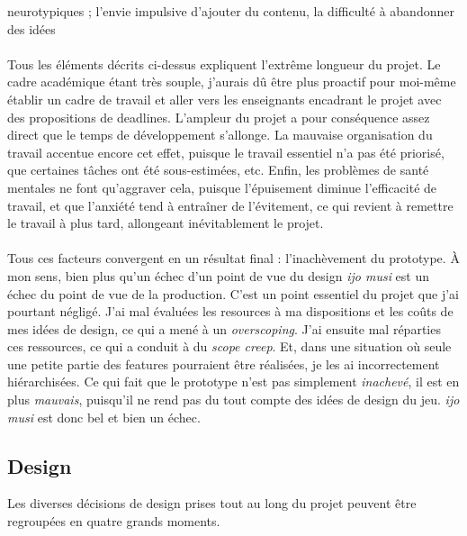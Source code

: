 \documentclass{scrartcl}
\let\emph\relax %
\begin{document}
neurotypiques ; l'envie impulsive d'ajouter du contenu, la difficulté à abandonner des idées\\
	
	\emph{Longueur du projet}\\
	Tous les éléments décrits ci-dessus expliquent l'extrême longueur du projet. Le cadre académique étant très souple, j'aurais dû être plus proactif pour moi-même établir un cadre de travail et aller vers les enseignants encadrant le projet avec des propositions de deadlines. L'ampleur du projet a pour conséquence assez direct que le temps de développement s'allonge. La mauvaise organisation du travail accentue encore cet effet, puisque le travail essentiel n'a pas été priorisé, que certaines tâches ont été sous-estimées, etc. Enfin, les problèmes de santé mentales ne font qu'aggraver cela, puisque l'épuisement diminue l'efficacité de travail, et que l'anxiété tend à entraîner de l'évitement, ce qui revient à remettre le travail à plus tard, allongeant inévitablement le projet.\\
	
	\emph{Prototype inachevé}\\
	Tous ces facteurs convergent en un résultat final : l'inachèvement du prototype. À mon sens, bien plus qu'un échec d'un point de vue du design \textit{ijo musi} est un échec du point de vue de la production. C'est un point essentiel du projet que j'ai pourtant négligé. J'ai mal évaluées les resources à ma dispositions et les coûts de mes idées de design, ce qui a mené à un \textit{overscoping}. J'ai ensuite mal réparties ces ressources, ce qui a conduit à du \textit{scope creep}. Et, dans une situation où seule une petite partie des features pourraient être réalisées, je les ai incorrectement hiérarchisées. Ce qui fait que le prototype n'est pas simplement \textit{inachevé}, il est en plus \textit{mauvais}, puisqu'il ne rend pas du tout compte des idées de design du jeu. \textit{ijo musi} est donc bel et bien un échec.
	
	\subsection*{Design}
	Les diverses décisions de design prises tout au long du projet peuvent être regroupées en quatre grands moments.\\
	
\end{document}
